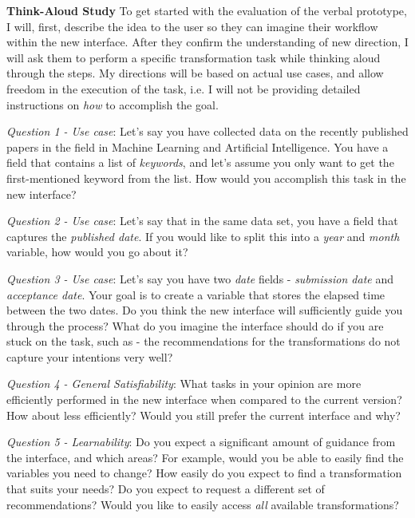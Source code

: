 \documentclass[12pt,letterpaper]{article}
\begin{document}
\textbf{Think-Aloud Study}
To get started with the evaluation of the verbal prototype, I will, first, describe the idea to the user so they can imagine their workflow within the new interface. After they confirm the understanding of new direction, I will ask them to perform a specific transformation task while thinking aloud through the steps. My directions will be based on actual use cases, and allow freedom in the execution of the task, i.e. I will not be providing detailed instructions on \textit{how} to accomplish the goal.

\textit{Question 1 - Use case}: Let's say you have collected data on the recently published papers in the field in Machine Learning and Artificial Intelligence. You have a field that contains a list of \textit{keywords}, and let's assume you only want to get the first-mentioned keyword from the list. How would you accomplish this task in the new interface?  

\textit{Question 2 - Use case}: Let's say that in the same data set, you have a field that captures the \textit{published date}. If you would like to split this into a \textit{year} and \textit{month} variable, how would you go about it?

\textit{Question 3 - Use case}: Let's say you have two \textit{date} fields - \textit{submission date} and \textit{acceptance date}. Your goal is to create a variable that stores the elapsed time between the two dates. Do you think the new interface will sufficiently guide you through the process? What do you imagine the interface should do if you are stuck on the task, such as - the recommendations for the transformations do not capture your intentions very well?   

\textit{Question 4 - General Satisfiability}: What tasks in your opinion are more efficiently performed in the new interface when compared to the current version? How about less efficiently? Would you still prefer the current interface and why? 

\textit{Question 5 - Learnability}: Do you expect a significant amount of guidance from the interface, and which areas? For example, would you be able to easily find the variables you need to change? How easily do you expect to find a transformation that suits your needs? Do you expect to request a different set of recommendations? Would you like to easily access \textit{all} available transformations? 
\end{document}
